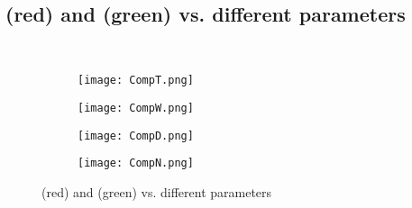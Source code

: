 \documentclass[oribibl]{llncs}
\begin{document}
\mbox{ } 

\newpage

\subsection{(red) and (green) vs. different parameters} 
\label{subsec:Ratio}
\mbox{ }

\begin{figure*}[h]
\centering
 \begin{subfigure}{.45\textwidth}
  \centering
  \texttt{[image: CompT.png]}
  \caption{}
  \label{fig:CompT}
\end{subfigure}
\hfill
 \begin{subfigure}{.45\textwidth}
  \centering
  \texttt{[image: CompW.png]}
  \caption{}
  \label{fig:CompW}
\end{subfigure}

 \begin{subfigure}{.45\textwidth}
  \centering
  \texttt{[image: CompD.png]}
  \caption{}
  \label{fig:CompD}
\end{subfigure}
\hfill
 \begin{subfigure}{.45\textwidth}
  \centering
  \texttt{[image: CompN.png]}
  \caption{}
  \label{fig:CompN}
\end{subfigure}

\caption{(red) and (green) vs. different parameters}
\label{fig:COMP}
\end{figure*}

\mbox{}
\end{document}

